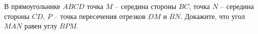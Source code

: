 \begin{ex}
	\begin{condition}
		В прямоугольнике \( ABCD  \) точка \( M \) – середина стороны \( BC \), точка \( N \) – середина стороны \( CD \), \( P \) – точка пересечения отрезков \( DM \) и \( BN  \). Докажите, что угол \( MAN  \) равен углу \( BPM  \).
	\end{condition}
\end{ex}
